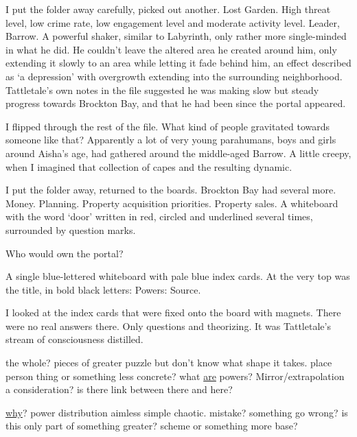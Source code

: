 I put the folder away carefully, picked out another.  Lost Garden. High threat level, low crime rate, low engagement level and moderate activity level.  Leader, Barrow.  A powerful shaker, similar to Labyrinth, only rather more single-minded in what he did.  He couldn't leave the altered area he created around him, only extending it slowly to an area while letting it fade behind him, an effect described as `a depression' with overgrowth extending into the surrounding neighborhood.  Tattletale's own notes in the file suggested he was making slow but steady progress towards Brockton Bay, and that he had been since the portal appeared.



I flipped through the rest of the file.  What kind of people gravitated towards someone like that?  Apparently a lot of very young parahumans, boys and girls around Aisha's age, had gathered around the middle-aged Barrow.  A little creepy, when I imagined that collection of capes and the resulting dynamic.



I put the folder away, returned to the boards.  Brockton Bay had several more.  Money.  Planning.  Property acquisition priorities.  Property sales.  A whiteboard with the word `door' written in red, circled and underlined several times, surrounded by question marks.



Who would own the portal?



A single blue-lettered whiteboard with pale blue index cards.  At the very top was the title, in bold black letters:  Powers: Source.



I looked at the index cards that were fixed onto the board with magnets.  There were no real answers there.  Only questions and theorizing.  It was Tattletale's stream of consciousness distilled.



the whole?  pieces of greater puzzle but don't know what shape it takes.  place person thing or something less concrete?  what \underline{are} powers?  Mirror/extrapolation a consideration? is there link between there and here?



\underline{why}?  power distribution aimless simple chaotic.  mistake?  something go wrong?  is this only part of something greater?  scheme or something more base?



